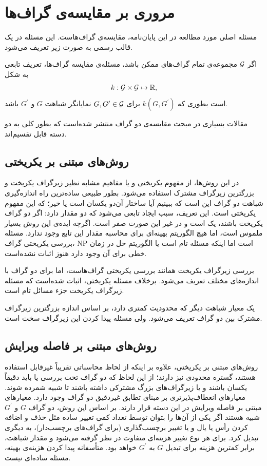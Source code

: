 \section{مروری بر مقایسه‌ی گراف‌ها}\label{sec:graph_comparison}
مسئله اصلی مورد مطالعه در این پایان‌نامه، مقایسه‌ی گراف‌هاست. این مسئله در یک قالب رسمی به صورت زیر تعریف می‌شود.

\begin{definition}
اگر $\mathcal{G}$ مجموعه‌ی تمام گراف‌های ممکن باشد، مسئله‌ی مقایسه گراف‌ها، تعریف تابعی به شکل
\begin{equation*}
k:\mathcal{G} \times \mathcal{G} \mapsto \mathbb{R},
\end{equation*}
است بطوری که $k(G,G^\prime)$ برای $G,G^\prime \in \mathcal{G}$ نمایانگر شباهت $G$ و $G^\prime$ باشد.
\end{definition}
مقالات بسیاری در مبحث مقایسه‌ی دو گراف منتشر شده‌است که بطور کلی به دو دسته قابل تقسیم‌اند.

\subsection{روش‌های مبتنی بر یکریختی}
در این روش‌ها، از مفهوم یکریختی و یا مفاهیم مشابه نظیر زیرگراف یکریخت و بزرگترین زیرگراف مشترک استفاده می‌شود. بطور طبیعی ساده‌ترین راه اندازه‌گیری شباهت دو گراف این است که ببینیم آیا ساختار آن‌دو یکسان است یا خیر؛ که این مفهوم یکریختی است. این تعریف، سبب ایجاد تابعی می‌شود که دو مقدار دارد: اگر دو گراف یکریخت باشند، یک است و در غیر این صورت صفر است. اگرچه ایده‌ی این روش بسیار ملموس است، اما هیچ الگوریتم بهینه‌ای برای محاسبه مقدار این تابع وجود ندارد. مسئله بررسی یکریختی گراف، NP‌ است اما اینکه مسئله  تام است یا الگوریتم حل در زمان خطی برای آن وجود دارد هنوز اثبات نشده‌است.

بررسی زیرگراف یکریخت همانند بررسی یکریختی گراف‌هاست، اما برای دو گراف با اندازه‌های مختلف تعریف می‌شود. برخلاف مسئله یکریختی، اثبات شده‌است که مسئله زیرگراف یکریخت جزء مسائل  تام است.

یک معیار شباهت دیگر که محدودیت کمتری دارد، بر اساس اندازه بزرگترین زیرگراف مشترک بین دو گراف تعریف می‌شود. ولی مسئله پیدا کردن این زیرگراف  سخت است.

\subsection{روش‌های مبتنی بر فاصله ویرایش}
روش‌های مبتنی بر یکریختی، علاوه بر اینکه از لحاظ محاسباتی تقریباً غیرقابل استفاده هستند، گستره محدودی نیز دارند؛ از این لحاظ که دو گراف تحت بررسی یا باید دقیقاً یکسان باشند و یا زیرگراف‌های بزرگ مشترکی داشته باشند تا شبیه شمرده شوند. معیارهای انعطاف‌پذیرتری بر مبنای تطابق غیردقیق دو گراف وجود دارد. معیارهای مبتنی بر فاصله ویرایش در این دسته قرار دارند. بر اساس این روش، دو گراف $G$ و $G^\prime$ شبیه هستند اگر یکی از آن‌ها را بتوان توسط تعداد کمی تغییر ساده مثل حذف و اضافه کردن رأس یا یال و یا تغییر برچسب‌گذاری (برای گراف‌های برچسب‌دار)، به دیگری تبدیل کرد. برای هر نوع تغییر هزینه‌‌ای متفاوت در نظر گرفته می‌شود و مقدار شباهت، برابر کمترین هزینه برای تبدیل $G$ به $G^\prime$ خواهد بود. متأسفانه پیدا کردن هزینه‌ی بهینه، مسئله ساده‌ای نیست.

